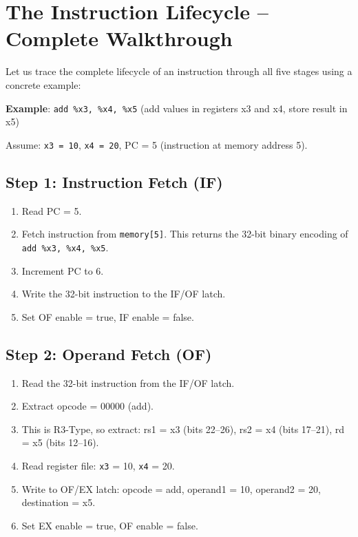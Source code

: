 \documentclass[12pt,a4paper]{article}
\begin{document}
\section{The Instruction Lifecycle -- Complete Walkthrough}

Let us trace the complete lifecycle of an instruction through all five stages using a concrete example:

\textbf{Example}: \texttt{add \%x3, \%x4, \%x5} (add values in registers x3 and x4, store result in x5)

Assume: \texttt{x3 = 10}, \texttt{x4 = 20}, PC = 5 (instruction at memory address 5).

\subsection{Step 1: Instruction Fetch (IF)}

\begin{enumerate}
    \item Read PC = 5.
    \item Fetch instruction from \texttt{memory[5]}. This returns the 32-bit binary encoding of \texttt{add \%x3, \%x4, \%x5}.
    \item Increment PC to 6.
    \item Write the 32-bit instruction to the IF/OF latch.
    \item Set OF enable = true, IF enable = false.
\end{enumerate}

\subsection{Step 2: Operand Fetch (OF)}

\begin{enumerate}
    \item Read the 32-bit instruction from the IF/OF latch.
    \item Extract opcode = 00000 (add).
    \item This is R3-Type, so extract: rs1 = x3 (bits 22--26), rs2 = x4 (bits 17--21), rd = x5 (bits 12--16).
    \item Read register file: \texttt{x3} = 10, \texttt{x4} = 20.
    \item Write to OF/EX latch: opcode = add, operand1 = 10, operand2 = 20, destination = x5.
    \item Set EX enable = true, OF enable = false.
\end{enumerate}
\end{document}
